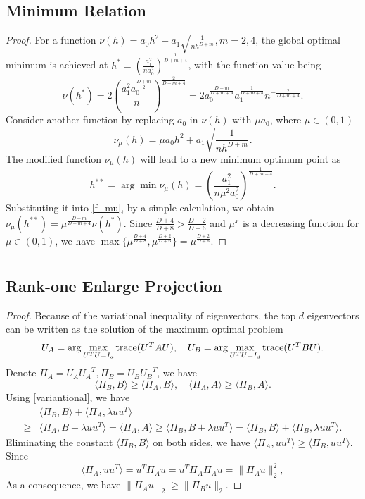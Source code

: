 \documentclass[aos,preprint]{imsart}
\theoremstyle{remark}
\begin{document}
\begin{appendix}
\subsection{Minimum Relation}
\begin{proof}\label{mimimum_proof}
For a function $\nu(h) = a_0 h^2 + a_1 \sqrt{\frac{1}{nh^{D+m}}}, m=2,4$, the global optimal minimum is achieved at $h^* = 
(\frac{a_1^2}{n a_0^2})^{\frac{1}{D+m+4}}$, with the function value being
\[
\nu(h^*) = 2(\frac{a_1^2 a_0^{\frac{D+m}{2}}}{n})^{\frac{2}{D+m+4}}=2 a_0^{\frac{D+m}{D+m+4}} a_1^{\frac{1}{D+m+4}} {n}^{-\frac{2}{D+m+4}}.
\]
Consider another function by replacing $a_0$ in $\nu(h)$ with $\mu a_0$, where $\mu\in(0,1)$
\begin{equation}\label{f_mu}
\nu_\mu (h) = \mu a_0 h^2 + a_1 \sqrt{\frac{1}{nh^{D+m}}}.
\end{equation}
The modified function $\nu_\mu(h)$ will lead to a new minimum optimum point as
\[
h^{**} =\arg\min \nu_\mu( h)=(\frac{a_1^2}{n \mu^2 a_0^2})^{\frac{1}{D+m+4}}.
\] 
Substituting it into \eqref{f_mu}, by a simple calculation, we obtain $\nu_\mu (h^{**}) = \mu^{\frac{D+m}{D+m+4}}\nu(h^*)$.
Since $\frac{D+4}{D+8}>\frac{D+2}{D+6}$ and $\mu^x$ is a decreasing function for $\mu\in (0,1)$, we have $\max\{\mu^{\frac{D+4}{D+8}}, \mu^{\frac{D+2}{D+6}}\} = \mu^{\frac{D+2}{D+6}}$. 
\end{proof}
\section{}
\subsection{Rank-one Enlarge Projection}
\begin{proof}\label{Rank-one Enlarge Projection}
Because of the variational inequality of eigenvectors, the top $d$ eigenvectors can be written as the solution of the maximum optimal problem
 \[
U_A = \arg\max_{U^TU = I_d} {\rm trace} (U^T A U), \quad U_B = \arg\max_{U^TU = I_d} {\rm trace} (U^T B U).
\]
Denote $\Pi_A = U_A {U_A}^T,  \Pi_B = U_B {U_B}^T$, we have 
\begin{equation}\label{variantional}
\langle \Pi_B , B \rangle \geq \langle \Pi_A , B \rangle,  \quad \langle \Pi_A , A \rangle \geq \langle \Pi_B , A \rangle.
\end{equation}
Using \eqref{variantional}, we have
\[
\begin{aligned}
&\langle \Pi_B, B\rangle+ \langle \Pi_A, \lambda uu^T\rangle\\
 \geq &\langle \Pi_A, B+\lambda uu^T \rangle = \langle \Pi_A , A \rangle   \geq  \langle \Pi_B, B+\lambda uu^T \rangle =  \langle \Pi_B, B\rangle + \langle \Pi_B, \lambda uu^T \rangle.
\end{aligned}
\]
Eliminating the constant $\langle \Pi_B, B\rangle$ on both sides, we have $\langle  \Pi_A , uu^T\rangle \geq  \langle  \Pi_B,  uu^T\rangle$. Since 
\[
\langle \Pi_A, uu^T \rangle= u^T \Pi_A u = u^T \Pi_A \Pi_A u = \|\Pi_A u\|_2^2,
\] 
As a consequence, we have $\|\Pi_A u\|_2\geq \|\Pi_B u\|_2$.
\end{proof}

\end{appendix}
\end{document}
